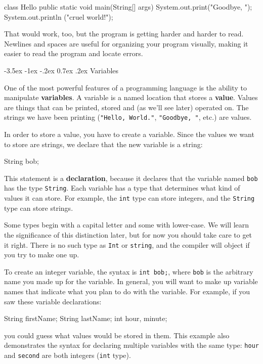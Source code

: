 \documentclass{book}
\makeatletter
\renewcommand{\section}{\@startsection 
    {section} {1} {0mm}%
    {-3.5ex \@plus -1ex \@minus -.2ex}%
    {0.7ex \@plus.2ex}%
    {\normalfont\Large\bfseries}}
\makeatother
\begin{document}
\begin{verbatimtab}
class Hello { public static void main(String[] args) {
System.out.print("Goodbye, "); System.out.println
("cruel world!");}}
\end{verbatimtab}
%
That would work, too, but
the program is getting harder and harder to read.  Newlines and
spaces are useful for organizing your program visually, making
it easier to read the program and locate errors.


\section {Variables}

One of the most powerful features of a programming language is the
ability to manipulate {\bf variables}.  A variable is a named location
that stores a {\bf value}.  Values are things that can be printed, stored
and (as we'll see later) operated on.  The strings we have been
printing ({\tt "Hello, World."}, {\tt "Goodbye, "}, etc.)  are values.

In order to store a value, you have to create a variable.  Since
the values we want to store are strings, we declare that
the new variable is a string:

\begin{verbatimtab}
    String bob;
\end{verbatimtab}
%
This statement is a {\bf declaration}, because it declares that the
variable named {\tt bob} has the type {\tt String}.  Each variable
has a type that determines what kind of values it can store.  For
example, the {\tt int} type can store integers, and the {\tt String}
type can store strings.


Some types begin with a capital letter and some
with lower-case.  We will learn the significance of this distinction
later, but for now you should take care to get it right.  There is no
such type as {\tt Int} or {\tt string}, and the compiler will object
if you try to make one up.

To create an integer variable, the syntax is {\tt int bob;},
where {\tt bob} is the arbitrary name you made up for the
variable.  In general, you will want to make up variable names
that indicate what you plan to do with the variable.  For
example, if you saw these variable declarations:

\begin{verbatimtab}
    String firstName;
    String lastName;
    int hour, minute;
\end{verbatimtab}
%
you could guess what values
would be stored in them.  This example
also demonstrates the syntax for declaring multiple variables
with the same type: {\tt hour} and {\tt second}
are both integers ({\tt int} type).
\end{document}

